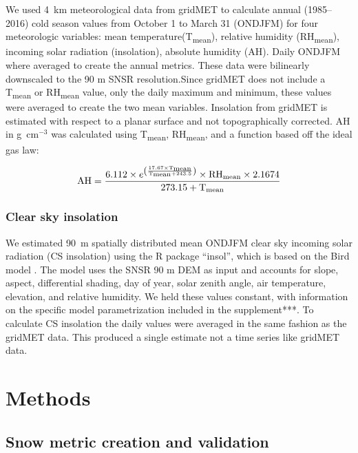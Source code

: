 We used 4~km meteorological data from gridMET \citep{abatzoglouDevelopmentGriddedSurface2013} to calculate annual (1985--2016) cold season values from October 1 to March 31 (ONDJFM) for four meteorologic variables: mean temperature(T\textsubscript{mean}), relative humidity (RH\textsubscript{mean}), incoming solar radiation (insolation), absolute humidity (AH). Daily ONDJFM where averaged to create the annual metrics. These data were bilinearly downscaled to the 90 m SNSR resolution.Since gridMET does not include a T\textsubscript{mean} or RH\textsubscript{mean} value, only the daily maximum and minimum, these values were averaged to create the two mean variables. Insolation from gridMET is estimated with respect to a planar surface and not topographically corrected. AH in g~cm$^{-3}$ was calculated using T\textsubscript{mean}, RH\textsubscript{mean}, and a function based off the ideal gas law:

\begin{equation}
\text{AH} = \frac{{6.112 \times e^{\left(\frac{{17.67 \times \text{T}\textsubscript{mean}}}{{\text{T}\textsubscript{mean} + 243.5}} \right)} \times \text{RH}\textsubscript{mean} \times 2.1674}} {{273.15 + \text{T}\textsubscript{mean}}}
\label{eq:ah}
\end{equation}


\hypertarget{ch2-do-2}{\subsubsection{Clear sky insolation}\label{ch2-do-2}}


We estimated 90~m spatially distributed mean ONDJFM clear sky incoming solar radiation (CS insolation) using the R package “insol”, which is based on the Bird model \citep{birdReviewEvaluationImprovement1981}. The model uses the SNSR 90 m DEM as input and accounts for slope, aspect, differential shading, day of year, solar zenith angle, air temperature, elevation, and relative humidity. We held these values constant, with information on the specific model parametrization included in the supplement***. To calculate CS insolation the daily values were averaged in the same fashion as the gridMET data. This produced a single estimate not a time series like gridMET data.


\hypertarget{ch2-methods}{\section{Methods}\label{ch2-methods}}
\hypertarget{ch2-methods-1}{\subsection{Snow metric creation and validation}\label{ch2-methods-1}}

